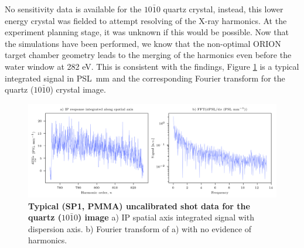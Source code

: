 No sensitivity data is available for the $10\bar{1}0$ quartz crystal, instead, this lower energy crystal was fielded to attempt resolving of the X-ray harmonics. At the experiment planning stage, it was unknown if this would be possible. Now that the simulations have been performed, we know that the non-optimal ORION target chamber geometry leads to the merging of the harmonics even before the water window at 282 eV. This is consistent with the findings, Figure \ref{fig:orionq1010} is a typical integrated signal in \unit{PSL.mm} and the corresponding Fourier transform for the quartz ($10\bar{1}0$) crystal image.
\begin{figure}
	\centering
	\includegraphics[width=1\linewidth]{figures/orion/orion_q1010}
	\caption[Typical ORION experiment uncalibrated IP response quartz ($10\bar{1}0$) crystal and Fourier transform]{\textbf{Typical (SP1, PMMA) uncalibrated shot data for the quartz ($10\bar{1}0$) image} a) IP spatial axis integrated signal with dispersion axis. b) Fourier transform of a) with no evidence of harmonics.}
	\label{fig:orionq1010}
\end{figure}

